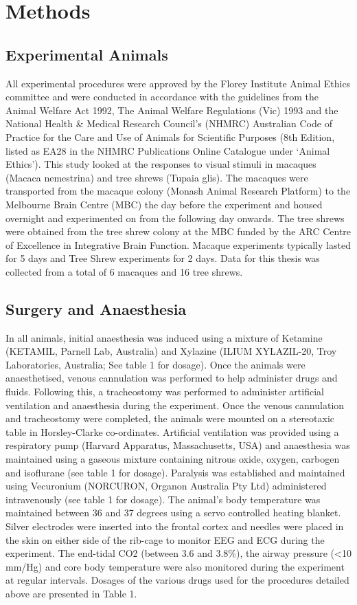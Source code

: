 \chapter{Methods}

	\section{Experimental Animals}
		All experimental procedures were approved by the Florey Institute Animal Ethics committee and were conducted in accordance with the guidelines from the Animal Welfare Act 1992, The Animal Welfare Regulations (Vic) 1993 and the National Health \& Medical Research Council’s (NHMRC) Australian Code of Practice for the Care and Use of Animals for Scientific Purposes (8th Edition, listed as EA28 in the NHMRC Publications Online Catalogue under ‘Animal Ethics’). This study looked at the responses to visual stimuli in macaques (Macaca nemestrina) and tree shrews (Tupaia glis). The macaques were transported from the macaque colony (Monash Animal Research Platform) to the Melbourne Brain Centre (MBC) the day before the experiment and housed overnight and experimented on from the following day onwards. The tree shrews were obtained from the tree shrew colony at the MBC funded by the ARC Centre of Excellence in Integrative Brain Function. Macaque experiments typically lasted for 5 days and Tree Shrew experiments for 2 days. Data for this thesis was collected from a total of 6 macaques and 16 tree shrews.
		
	\section{Surgery and Anaesthesia}
	
		In all animals, initial anaesthesia was induced using a mixture of Ketamine (KETAMIL, Parnell Lab, Australia) and Xylazine (ILIUM XYLAZIL-20, Troy Laboratories, Australia; See table 1 for dosage). Once the animals were anaesthetised, venous cannulation was performed to help administer drugs and fluids. Following this, a tracheostomy was performed to administer artificial ventilation and anaesthesia during the experiment. Once the venous cannulation and tracheostomy were completed, the animals were mounted on a stereotaxic table in Horsley-Clarke co-ordinates. Artificial ventilation was provided using a respiratory pump (Harvard Apparatus, Massachusetts, USA) and anaesthesia was maintained using a gaseous mixture containing nitrous oxide, oxygen, carbogen and isoflurane (see table 1 for dosage). Paralysis was established and maintained using Vecuronium (NORCURON, Organon Australia Pty Ltd) administered intravenously (see table 1 for dosage). The animal's body temperature was maintained between 36 and 37 degrees using a servo controlled heating blanket. Silver electrodes were inserted into the frontal cortex and needles were placed in the skin on either side of the rib-cage to monitor EEG and ECG during the experiment. The end-tidal CO2 (between 3.6 and 3.8\%), the airway pressure (<10 mm/Hg) and core body temperature were also monitored during the experiment at regular intervals. Dosages of the various drugs used for the procedures detailed above are presented in Table 1.
		
